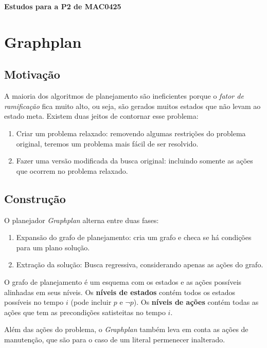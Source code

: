 \documentclass[12pt,letterpaper]{article}
\begin{document}
	\begin{center}
		\LARGE \bf
		Estudos para a P2 de MAC0425
	\end{center}

	\section*{Graphplan}
	
	\subsection*{Motivação}
	
	A maioria dos algoritmos de planejamento são ineficientes porque o \textit{fator de ramificação} fica muito alto, ou seja, são gerados muitos estados que não levam ao estado meta. Existem duas jeitos de contornar esse problema:
	
	\begin{enumerate}
		\item Criar um problema relaxado: removendo algumas restrições do problema original, teremos um problema mais fácil de ser resolvido.
		\item Fazer uma versão modificada da busca original: incluindo somente as ações que ocorrem no problema relaxado.
	\end{enumerate}
	
	\subsection*{Construção}
	
	O planejador \textit{Graphplan} alterna entre duas fases:
	
	\begin{enumerate}
		\item Expansão do grafo de planejamento: cria um grafo e checa se há condições para um plano solução.
		\item Extração da solução: Busca regressiva, considerando apenas as ações do grafo.
	\end{enumerate}
	
	O grafo de planejamento é um esquema com os estados e as ações possíveis alinhadas em seus níveis. Os \textbf{níveis de estados} contém todos os estados possíveis no tempo $i$ (pode incluir $p$ e $\lnot p$). Os \textbf{níveis de ações} contém todas as ações que tem as precondições satisteitas no tempo $i$.
	
	Além das ações do problema, o \textit{Graphplan} também leva em conta as ações de manutenção, que são para o caso de um literal permenecer inalterado.
	
\end{document}
